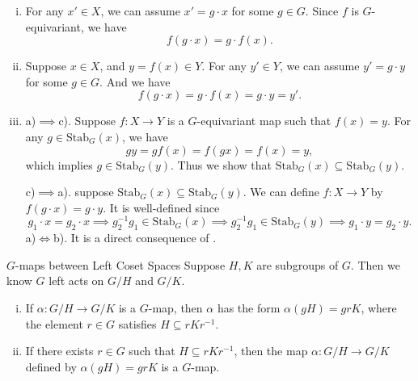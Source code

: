\begin{prf}
    \begin{enumerate}[(i)]
        \item For any $x'\in X$, we can assume $x'=g\cdot x$ for some $g\in G$. Since $f$ is $G$-equivariant, we have
        \[
            f(g\cdot x)=g\cdot f(x).
        \]
        \item Suppose $x\in X$, and $y=f(x)\in Y$. For any $y'\in Y$, we can assume $y'=g\cdot y$ for some $g\in G$. And we have
        \[
            f(g\cdot x)=g\cdot f(x)=g\cdot y=y'.
        \]
        \item a)$\implies$c). Suppose $f:X\to Y$ is a $G$-equivariant map such that $f(x)=y$. For any $g\in \mathrm{Stab}_G(x)$, we have
        \[
            gy=g f(x)=f(gx)=f(x)=y,
        \]
        which implies $g\in \mathrm{Stab}_G(y)$. Thus we show that $\mathrm{Stab}_G(x)\subseteq \mathrm{Stab}_G(y)$.

        c)$\implies$a). suppose $\mathrm{Stab}_G(x)\subseteq \mathrm{Stab}_G(y)$. We can define $f:X\to Y$ by $f(g\cdot x)=g\cdot y$. It is well-defined since
        \[
            g_1\cdot x=g_2 \cdot x\implies g_2^{-1}g_1\in \mathrm{Stab}_G(x)\implies g_2^{-1}g_1\in \mathrm{Stab}_G(y)\implies g_1\cdot y=g_2\cdot y.
        \]
        a)$\iff$b). It is a direct consequence of . 
    \end{enumerate}
\end{prf}


\begin{corollary}{$G$-maps between Left Coset Spaces}{}
    Suppose $H,K$ are subgroups of $G$. Then we know $G$ left acts on $G/H$ and $G/K$. 
    \begin{enumerate}[(i)]
        \item If $\alpha: G / H \longrightarrow G / K$ is a $G$-map, then $\alpha$ has the form $\alpha(g H)=g r K$, where the element $r \in G$ satisfies $H \subseteq rKr^{-1} $.
        \item If there exists $r \in G$ such that $H \subseteq rK r^{-1} $, then the map $\alpha: G / H \longrightarrow G / K$ defined by $\alpha(g H)=g r K$ is a $G$-map.
    \end{enumerate}
\end{corollary}


